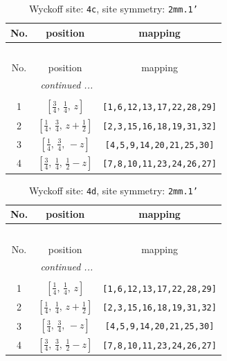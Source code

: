 \documentclass[fleqn,8pt]{jsarticle}
\begin{document}
\renewcommand{\arraystretch}{1.2}
\begin{longtable}{ccc}
\caption{Wyckoff site: {\tt 4c}, site symmetry: {\tt 2mm.1'}}
 \\
 \hline \hline
No. & position & mapping \\ \hline \endfirsthead

\multicolumn{2}{l}{\tablename\ \thetable{}} \\
 \hline \hline
No. & position & mapping \\ \hline \endhead

 \hline \hline
\multicolumn{2}{r}{\footnotesize\it continued ...} \\ \endfoot

 \hline \hline
\multicolumn{2}{r}{} \\ \endlastfoot

1 & $\left[ \frac{3}{4},\, \frac{1}{4},\, z \right]$ & {\tt [1,6,12,13,17,22,28,29]} \\ \hline
2 & $\left[ \frac{1}{4},\, \frac{3}{4},\, z + \frac{1}{2} \right]$ & {\tt [2,3,15,16,18,19,31,32]} \\ \hline
3 & $\left[ \frac{1}{4},\, \frac{3}{4},\, - z \right]$ & {\tt [4,5,9,14,20,21,25,30]} \\ \hline
4 & $\left[ \frac{3}{4},\, \frac{1}{4},\, \frac{1}{2} - z \right]$ & {\tt [7,8,10,11,23,24,26,27]} \\
\end{longtable}
\renewcommand{\arraystretch}{1.2}
\begin{longtable}{ccc}
\caption{Wyckoff site: {\tt 4d}, site symmetry: {\tt 2mm.1'}}
 \\
 \hline \hline
No. & position & mapping \\ \hline \endfirsthead

\multicolumn{2}{l}{\tablename\ \thetable{}} \\
 \hline \hline
No. & position & mapping \\ \hline \endhead

 \hline \hline
\multicolumn{2}{r}{\footnotesize\it continued ...} \\ \endfoot

 \hline \hline
\multicolumn{2}{r}{} \\ \endlastfoot

1 & $\left[ \frac{1}{4},\, \frac{1}{4},\, z \right]$ & {\tt [1,6,12,13,17,22,28,29]} \\ \hline
2 & $\left[ \frac{1}{4},\, \frac{1}{4},\, z + \frac{1}{2} \right]$ & {\tt [2,3,15,16,18,19,31,32]} \\ \hline
3 & $\left[ \frac{3}{4},\, \frac{3}{4},\, - z \right]$ & {\tt [4,5,9,14,20,21,25,30]} \\ \hline
4 & $\left[ \frac{3}{4},\, \frac{3}{4},\, \frac{1}{2} - z \right]$ & {\tt [7,8,10,11,23,24,26,27]} \\
\end{longtable}
\end{document}
